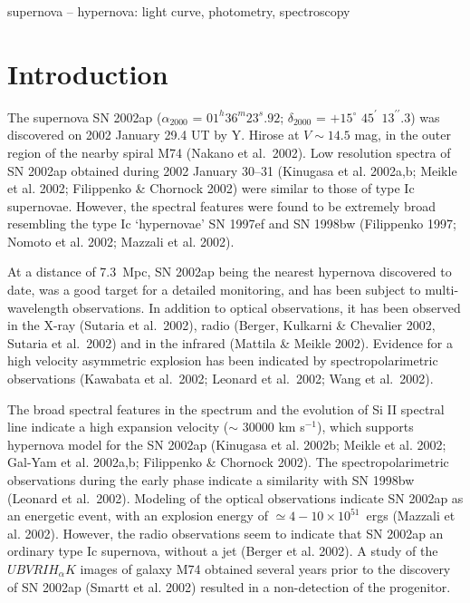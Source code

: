 \begin{keywords}
supernova -- hypernova: light curve, photometry, spectroscopy
\end{keywords}

\section{Introduction}

The supernova SN 2002ap ($\alpha_{2000}$ = $01^{h}36^{m}23^{s}.92 $;
$\delta_{2000}$ = $+15^{\circ}$ $45^{\prime}$ $13^{\prime\prime}.3$) was
discovered on 2002 January 29.4 UT by Y. Hirose at $V \sim 14.5$ mag, in the
outer region of the nearby spiral M74 (Nakano et al.\ 2002). Low resolution 
spectra of SN 2002ap obtained during 2002 January 30--31 (Kinugasa et al. 
2002a,b; Meikle et al. 2002; Filippenko \& Chornock 2002) 
were similar to those of type Ic supernovae. However, the spectral 
features were found to be extremely broad resembling the type Ic `hypernovae'
SN 1997ef and SN 1998bw (Filippenko 1997; Nomoto et al. 2002; Mazzali et al. 2002). 

At a distance of 7.3~Mpc, SN 2002ap being the nearest hypernova discovered to 
date, was a good target for a detailed monitoring, and has been subject to multi-wavelength 
observations. In addition to optical observations, it has been observed in the 
X-ray (Sutaria et al.\ 2002), radio (Berger, Kulkarni \& Chevalier 2002, Sutaria et al.\ 2002) 
and in the infrared (Mattila \& Meikle 2002). Evidence for a high velocity asymmetric 
explosion has been indicated by spectropolarimetric observations (Kawabata et 
al.\ 2002; Leonard et al.\ 2002; Wang et al.\ 2002). 

The broad spectral features in the spectrum and the evolution
of Si II spectral line indicate a high expansion velocity ($\sim$ 30000
km s$^{-1}$), which supports hypernova model for the SN 2002ap (Kinugasa et al.
2002b; Meikle et al. 2002; Gal-Yam et al. 2002a,b; Filippenko \& Chornock
2002). The spectropolarimetric observations during the early phase indicate a
similarity with SN 1998bw (Leonard et al.\ 2002). Modeling of the optical
observations indicate SN 2002ap as an energetic event, with an explosion
energy of $\simeq 4-10\times 10^{51}$~ergs (Mazzali et al. 2002). However, the 
radio observations seem to indicate that SN 2002ap an ordinary type Ic 
supernova, without a jet (Berger et al. 2002). A study of the 
$UBVRIH_{\alpha}K$ images of galaxy M74 obtained several years prior to the 
discovery of SN 2002ap (Smartt et al. 2002) resulted in a non-detection of the
progenitor.


